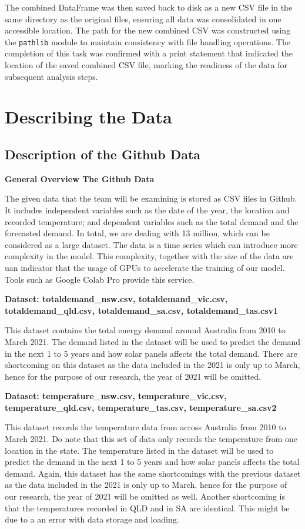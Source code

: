 \documentclass[
]{article}
\begin{document}
The combined DataFrame was then saved back to disk as a new CSV file in
the same directory as the original files, ensuring all data was
consolidated in one accessible location. The path for the new combined
CSV was constructed using the \texttt{pathlib} module to maintain
consistency with file handling operations. The completion of this task
was confirmed with a print statement that indicated the location of the
saved combined CSV file, marking the readiness of the data for
subsequent analysis steps.

\section{Describing the Data}\label{describing-the-data}

\subsection{Description of the Github
Data}\label{description-of-the-github-data}

\textbf{General Overview The Github Data}

The given data that the team will be examining is stored as CSV files in
Github. It includes independent variables such as the date of the year,
the location and recorded temperature; and dependent variables such as
the total demand and the forecasted demand. In total, we are dealing
with 13 million, which can be considered as a large dataset. The data is
a time series which can introduce more complexity in the model. This
complexity, together with the size of the data are uan indicator that
the usage of GPUs to accelerate the training of our model. Tools such as
Google Colab Pro provide this service.

\textbf{Dataset: totaldemand\_nsw.csv, totaldemand\_vic.csv,
totaldemand\_qld.csv, totaldemand\_sa.csv, totaldemand\_tas.csv1}

This dataset contains the total energy demand around Australia from 2010
to March 2021. The demand listed in the dataset will be used to predict
the demand in the next 1 to 5 years and how solar panels affects the
total demand. There are shortcoming on this dataset as the data included
in the 2021 is only up to March, hence for the purpose of our research,
the year of 2021 will be omitted.

\textbf{Dataset: temperature\_nsw.csv, temperature\_vic.csv,
temperature\_qld.csv, temperature\_tas.csv, temperature\_sa.csv2}

This dataset records the temperature data from across Australia from
2010 to March 2021. Do note that this set of data only records the
temperature from one location in the state. The temperature listed in
the dataset will be used to predict the demand in the next 1 to 5 years
and how solar panels affects the total demand. Again, this dataset has
the same shortcomings with the previous dataset as the data included in
the 2021 is only up to March, hence for the purpose of our research, the
year of 2021 will be omitted as well. Another shortcoming is that the
temperatures recorded in QLD and in SA are identical. This might be due
to a an error with data storage and loading.
\end{document}
